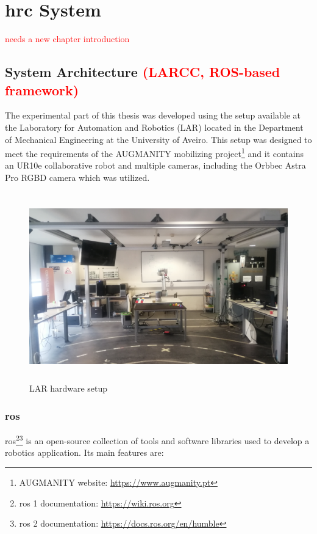\chapter{\acl{hrc} System}
\label{chapter:hrc_system}

\textcolor{red}{needs a new chapter introduction}

\section{System Architecture \textcolor{red}{(LARCC, ROS-based framework)}}

The experimental part of this thesis was developed using the setup available at the Laboratory for Automation and Robotics (LAR) located in the Department of Mechanical Engineering at the University of Aveiro. This setup was designed to meet the requirements of the AUGMANITY mobilizing project\footnote{AUGMANITY website: \url{https://www.augmanity.pt}} and it contains an UR10e collaborative robot and multiple cameras, including the Orbbec Astra Pro RGBD camera which was utilized.

\begin{figure}[h]
\centerline{\includegraphics[height=3.2in]{figs/setup2.jpg}}
\caption[setup]{LAR hardware setup}
\label{fig:ur10e}
\end{figure}

\subsection{\acf{ros}}

\acs{ros}\cite{ROS2}\footnote{\acs{ros} 1 documentation: \url{https://wiki.ros.org}}\footnote{\acs{ros} 2 documentation: \url{https://docs.ros.org/en/humble}} is an open-source collection of tools and software libraries used to develop a robotics application. Its main features are:

